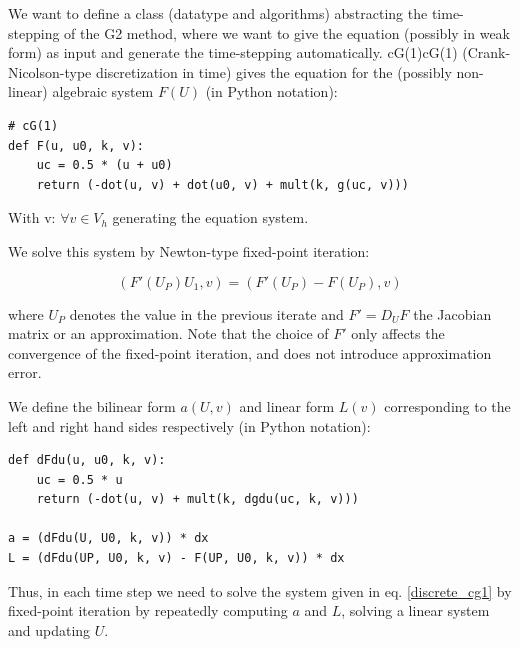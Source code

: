 We want to define a class (datatype and algorithms) abstracting the
time-stepping of the G2 method, where we want to give the equation
(possibly in weak form) as input and generate the time-stepping
automatically. cG(1)cG(1) (Crank-Nicolson-type discretization in time)
gives the equation for the (possibly non-linear) algebraic system
$F(U)$ (in Python notation):


\begin{lstlisting}
# cG(1)
def F(u, u0, k, v):
    uc = 0.5 * (u + u0)
    return (-dot(u, v) + dot(u0, v) + mult(k, g(uc, v)))
\end{lstlisting}

With v: $\forall v \in V_h$ generating the equation system.

We solve this system by Newton-type fixed-point iteration:

\begin{equation}
(F'(U_P) U_1, v) = (F'(U_P) - F(U_P), v)
\label{discrete_cg1}
\end{equation}

where $U_P$ denotes the value in the previous iterate and $F' = D_U F$
the Jacobian matrix or an approximation. Note that the choice of $F'$
only affects the convergence of the fixed-point iteration, and does
not introduce approximation error.

We define the bilinear form $a(U, v)$ and linear form $L(v)$
corresponding to the left and right hand sides respectively (in Python
notation):


{\small
\begin{lstlisting}
def dFdu(u, u0, k, v):
    uc = 0.5 * u
    return (-dot(u, v) + mult(k, dgdu(uc, k, v)))

a = (dFdu(U, U0, k, v)) * dx
L = (dFdu(UP, U0, k, v) - F(UP, U0, k, v)) * dx
\end{lstlisting}
}

Thus, in each time step we need to solve the system given in
eq. \ref{discrete_cg1} by fixed-point iteration by repeatedly
computing $a$ and $L$, solving a linear system and updating $U$.

